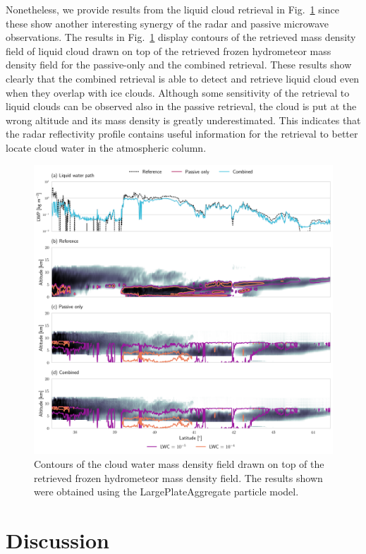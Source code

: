 \documentclass[journal abbreviation, manuscript]{copernicus}
\begin{document}
Nonetheless, we provide results from the liquid cloud retrieval in
Fig.~\ref{fig:results_cw_b} since these show another interesting synergy of the
radar and passive microwave observations. The results in
Fig.~\ref{fig:results_cw_b} display contours of the retrieved mass density field
of liquid cloud drawn on top of the retrieved frozen hydrometeor mass density
field for the passive-only and the combined retrieval. These results show
clearly that the combined retrieval is able to detect and retrieve liquid cloud
even when they overlap with ice clouds. Although some sensitivity of the
retrieval to liquid clouds can be observed also in the passive retrieval, the
cloud is put at the wrong altitude and its mass density is greatly
underestimated. This indicates that the radar reflectivity profile contains
useful information for the retrieval to better locate cloud water in the
atmospheric column.

\begin{figure}
\centering
\includegraphics[width = \textwidth]{../plots/results_cw_b_LargePlateAggregate}
\caption{Contours of the cloud water mass density field drawn on top of the retrieved
  frozen hydrometeor mass density field. The results shown were obtained using the
  LargePlateAggregate particle model.}
\label{fig:results_cw_b}
\end{figure}


\section{Discussion}
\label{sec:discussion}
\end{document}
